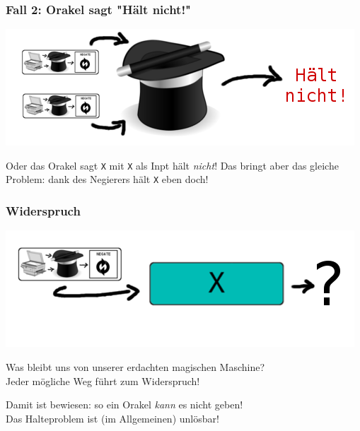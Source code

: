 \documentclass[aspectratio=43]{beamer}
\begin{document}

\begin{frame}
\frametitle{Fall 2: Orakel sagt "Hält nicht!"}

\begin{center}
\includegraphics[scale=1.4]{images/input_hat_haltsnot.png} 
\bigskip

Oder das Orakel sagt \texttt{X} mit \texttt{X} als Inpt hält \emph{nicht}! Das bringt aber das gleiche Problem: dank des Negierers hält \texttt{X} eben doch! 
\end{center}
\end{frame}


\begin{frame}
\frametitle{Widerspruch}
\begin{center}
\includegraphics[scale=1.4]{images/input.png} 
\bigskip

Was bleibt uns von unserer erdachten magischen Maschine?\\
Jeder mögliche Weg führt zum Widerspruch!
\pause\bigskip

Damit ist bewiesen: so ein Orakel \emph{kann} es nicht geben!\\
Das Halteproblem ist (im Allgemeinen) unlösbar!
\end{center}
\end{frame}

\end{document}
